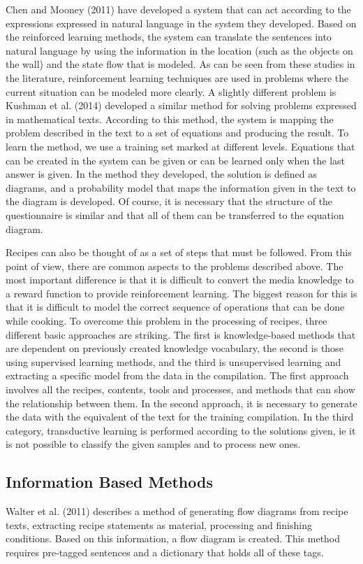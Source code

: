 Chen and Mooney (2011) have developed a system that can act according to the expressions expressed in natural language in the system they developed. Based on the reinforced learning methods, the system can translate the sentences into natural language by using the information in the location (such as the objects on the wall) and the state flow that is modeled. As can be seen from these studies in the literature, reinforcement learning techniques are used in problems where the current situation can be modeled more clearly.
A slightly different problem is Kushman et al. (2014) developed a similar method for solving problems expressed in mathematical texts. According to this method, the system is mapping the problem described in the text to a set of equations and producing the result. To learn the method, we use a training set marked at different levels. Equations that can be created in the system can be given or can be learned only when the last answer is given. In the method they developed, the solution is defined as diagrams, and a probability model that maps the information given in the text to the diagram is developed. Of course, it is necessary that the structure of the questionnaire is similar and that all of them can be transferred to the equation diagram.

Recipes can also be thought of as a set of steps that must be followed. From this point of view, there are common aspects to the problems described above. The most important difference is that it is difficult to convert the media knowledge to a reward function to provide reinforcement learning. The biggest reason for this is that it is difficult to model the correct sequence of operations that can be done while cooking. To overcome this problem in the processing of recipes, three different basic approaches are striking. The first is knowledge-based methods that are dependent on previously created knowledge vocabulary, the second is those using supervised learning methods, and the third is unsupervised learning and extracting a specific model from the data in the compilation. The first approach involves all the recipes, contents, tools and processes, and methods that can show the relationship between them. In the second approach, it is necessary to generate the data with the equivalent of the text for the training compilation. In the third category, transductive learning is performed according to the solutions given, ie it is not possible to classify the given samples and to process new ones.

\subsection{Information Based Methods}
Walter et al. (2011) describes a method of generating flow diagrams from recipe texts, extracting recipe statements as material, processing and finishing conditions. Based on this information, a flow diagram is created. This method requires pre-tagged sentences and a dictionary that holds all of these tags.

